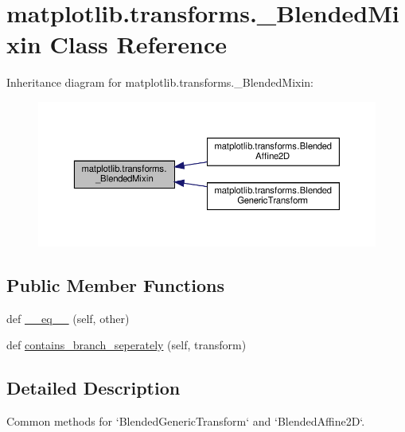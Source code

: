 \hypertarget{classmatplotlib_1_1transforms_1_1__BlendedMixin}{}\section{matplotlib.\+transforms.\+\_\+\+Blended\+Mixin Class Reference}
\label{classmatplotlib_1_1transforms_1_1__BlendedMixin}


Inheritance diagram for matplotlib.\+transforms.\+\_\+\+Blended\+Mixin\+:
\nopagebreak
\begin{figure}[H]
\begin{center}
\leavevmode
\includegraphics[width=350pt]{classmatplotlib_1_1transforms_1_1__BlendedMixin__inherit__graph}
\end{center}
\end{figure}
\subsection*{Public Member Functions}
\begin{DoxyCompactItemize}
\item 
def \hyperlink{classmatplotlib_1_1transforms_1_1__BlendedMixin_a621dfb96d33a0dd0e260271fb473909e}{\+\_\+\+\_\+eq\+\_\+\+\_\+} (self, other)
\item 
def \hyperlink{classmatplotlib_1_1transforms_1_1__BlendedMixin_ace52621f3885c2e1588b59df36638e58}{contains\+\_\+branch\+\_\+seperately} (self, transform)
\end{DoxyCompactItemize}


\subsection{Detailed Description}
\begin{DoxyVerb}Common methods for `BlendedGenericTransform` and `BlendedAffine2D`.\end{DoxyVerb}
 


